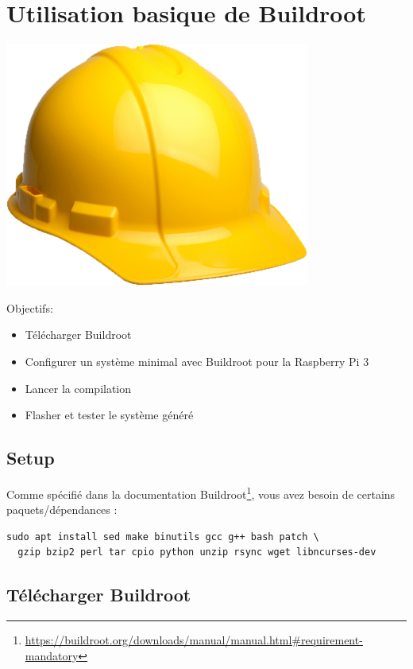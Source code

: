 \chapter {Utilisation basique de Buildroot}
\begin{centering}
  \includegraphics[height=0.1\textheight]{pictures/br.png} \\
\end{centering}
{Objectifs:
  \begin{itemize}
  \item Télécharger Buildroot
  \item Configurer un système minimal avec Buildroot pour la Raspberry Pi 3
  \item Lancer la compilation
  \item Flasher et tester le système généré
  \end{itemize}
}

\section{Setup}

Comme spécifié dans la documentation Buildroot\footnote{\url{https://buildroot.org/downloads/manual/manual.html\#requirement-mandatory}}, vous avez besoin de certains paquets/dépendances :

\begin{verbatim}
sudo apt install sed make binutils gcc g++ bash patch \
  gzip bzip2 perl tar cpio python unzip rsync wget libncurses-dev
\end{verbatim}

\section{Télécharger Buildroot}

